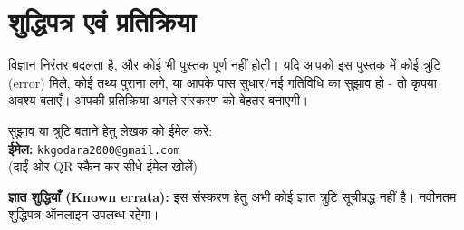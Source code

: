 \chapter*{शुद्धिपत्र एवं प्रतिक्रिया}

विज्ञान निरंतर बदलता है, और कोई भी पुस्तक पूर्ण नहीं होती। यदि आपको इस पुस्तक में कोई
त्रुटि (error) मिले, कोई तथ्य पुराना लगे, या आपके पास सुधार/नई गतिविधि का सुझाव हो -
तो कृपया अवश्य बताएँ। आपकी प्रतिक्रिया अगले संस्करण को बेहतर बनाएगी।

\vspace{10pt}
\begin{tcolorbox}[aiboxbase, colback=cvCyan!7, colframe=cvCyan,
   title={\boxmk प्रतिक्रिया भेजें (Send Feedback)}]
\begin{minipage}[c]{0.74\linewidth}
  सुझाव या त्रुटि बताने हेतु लेखक को ईमेल करें:\\[3pt]
  \textbf{ईमेल:} \texttt{kkgodara2000@gmail.com}\\[2pt]
  {\footnotesize\color{aigrey}(दाईं ओर QR स्कैन कर सीधे ईमेल खोलें)}
\end{minipage}\hfill
\begin{minipage}[c]{0.22\linewidth}\raggedleft
\end{minipage}
\end{tcolorbox}

\vspace{8pt}
\noindent\textbf{ज्ञात शुद्धियाँ (Known errata):} इस संस्करण हेतु अभी कोई ज्ञात त्रुटि
सूचीबद्ध नहीं है। नवीनतम शुद्धिपत्र ऑनलाइन उपलब्ध रहेगा।

